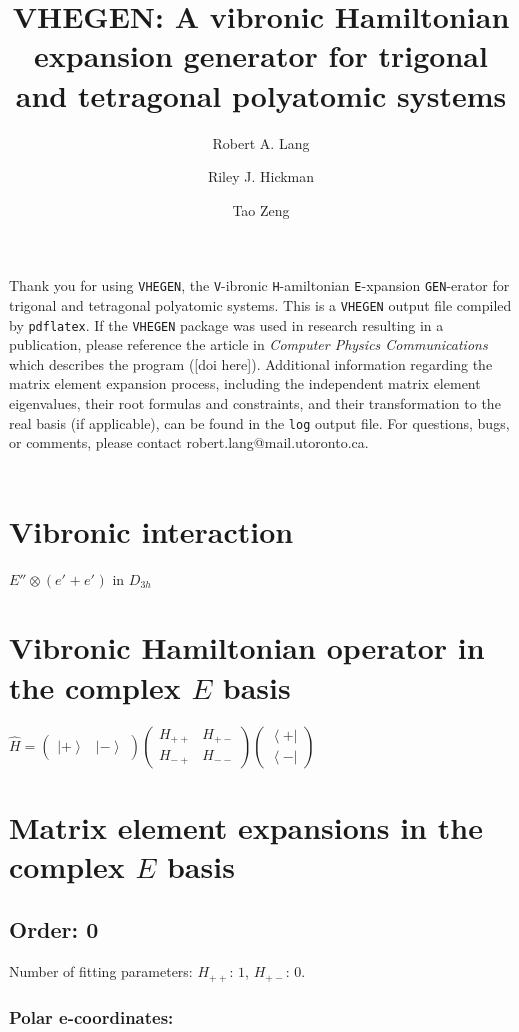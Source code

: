 \documentclass[fleqn]{article}
\title{VHEGEN: A vibronic Hamiltonian expansion generator for trigonal and tetragonal polyatomic systems}
\author{Robert A. Lang \and Riley J. Hickman \and Tao Zeng}
\date{}
\begin{document}
\maketitle
Thank you for using \texttt{VHEGEN}, the \texttt{V}-ibronic \texttt{H}-amiltonian \texttt{E}-xpansion \texttt{GEN}-erator for trigonal and tetragonal polyatomic systems. This is a \texttt{VHEGEN} output file compiled by \texttt{pdflatex}. If the \texttt{VHEGEN} package was used in research resulting in a publication, please reference the article in \textit{Computer Physics Communications} which describes the program ([doi here]). Additional information regarding the matrix element expansion process, including the independent matrix element eigenvalues, their root formulas and constraints, and their transformation to the real basis (if applicable), can be found in the \texttt{log} output file. For questions, bugs, or comments, please contact robert.lang@mail.utoronto.ca.\\\\
\tableofcontents
\newpage
\section{Vibronic interaction}
$E''_{} \otimes (e'_{}+e'_{})$ in $D_{3h}$
\section{Vibronic Hamiltonian operator in the complex $E$ basis}
$\hat{H}=\left(\begin{matrix}{\left|+\right\rangle } & {\left|-\right\rangle }\end{matrix}\right) \left(\begin{matrix}H_{++} & H_{+-}\\H_{-+} & H_{--}\end{matrix}\right) \left(\begin{matrix}{\left\langle +\right|}\\{\left\langle -\right|}\end{matrix}\right)$
\section{Matrix element expansions in the complex $E$ basis}
\subsection{Order: 0}
Number of fitting parameters: $H_{++}$: $1$, $H_{+-}$: $0$.
\subsubsection*{Polar e-coordinates:}
\end{document}
